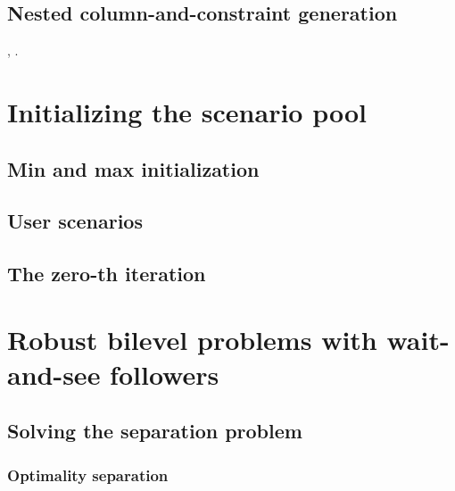 \subsection{Nested column-and-constraint generation}

\textcite{Subramanyam2022}, \textcite{lefebvre2025correctiontolagrangiandual}.


\section{Initializing the scenario pool}
\label{sec:ccg:initial-scenario}

\subsection{Min and max initialization}


\subsection{User scenarios}


\subsection{The zero-th iteration}


\section{Robust bilevel problems with wait-and-see followers}


\subsection{Solving the separation problem}

\subsubsection{Optimality separation}

